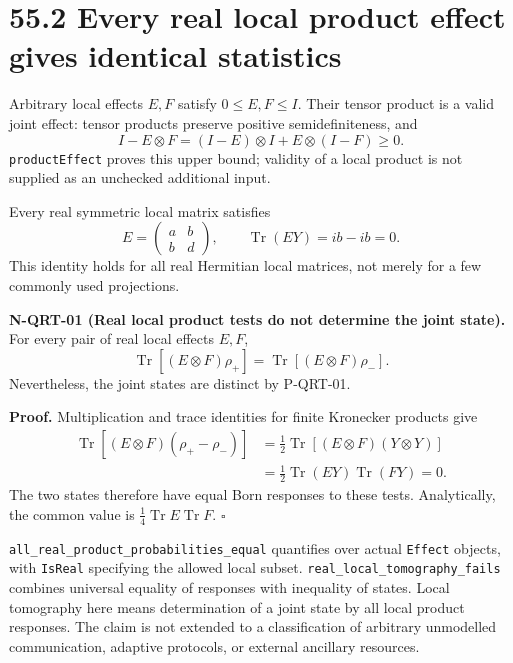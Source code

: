 \documentclass[
  11pt,
  oneside]{book}
\begin{document}
\section{55.2 Every real local product effect gives identical
statistics}

Arbitrary local effects \(E,F\) satisfy \(0\le E,F\le I\). Their tensor
product is a valid joint effect: tensor products preserve positive
semidefiniteness, and \[
I-E\otimes F=(I-E)\otimes I+E\otimes(I-F)\ge0.
\] \texttt{product\allowbreak Effect} proves this upper bound; validity of a local
product is not supplied as an unchecked additional input.

Every real symmetric local matrix satisfies \[
E=\begin{pmatrix}a&b\\b&d\end{pmatrix},
\qquad \operatorname{Tr}(EY)=ib-ib=0.
\] This identity holds for all real Hermitian local matrices, not merely
for a few commonly used projections.

\label{n-qrt-01}{}

\textbf{N-QRT-01 (Real local product tests do not determine the joint
state).} For every pair of real local effects \(E,F\), \[
\operatorname{Tr}[(E\otimes F)\rho_+]
=\operatorname{Tr}[(E\otimes F)\rho_-].
\] Nevertheless, the joint states are distinct by P-QRT-01.

\textbf{Proof.} Multiplication and trace identities for finite Kronecker
products give \[
\begin{aligned}
\operatorname{Tr}[(E\otimes F)(\rho_+-\rho_-)]
&=\tfrac12\operatorname{Tr}[(E\otimes F)(Y\otimes Y)]\\
&=\tfrac12\operatorname{Tr}(EY)\operatorname{Tr}(FY)=0.
\end{aligned}
\] The two states therefore have equal Born responses to these tests.
Analytically, the common value is
\(\tfrac14\operatorname{Tr}E\operatorname{Tr}F\). \(\square\)

\texttt{all\_\allowbreak real\_\allowbreak product\_\allowbreak probabilities\_\allowbreak equal} quantifies over actual
\texttt{Effect} objects, with \texttt{Is\allowbreak Real} specifying the allowed
local subset. \texttt{real\_\allowbreak local\_\allowbreak tomography\_\allowbreak fails} combines universal
equality of responses with inequality of states. Local tomography here
means determination of a joint state by all local product responses. The
claim is not extended to a classification of arbitrary unmodelled
communication, adaptive protocols, or external ancillary resources.
\end{document}
